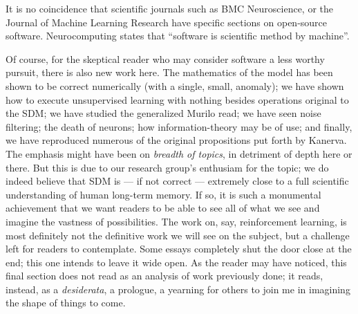 It is no coincidence that scientific journals such as BMC Neuroscience, or the Journal of Machine Learning Research have specific sections on open-source software. Neurocomputing states that “software is scientific method by machine”.

Of course, for the skeptical reader who may consider software a less worthy pursuit, there is also new work here.  The mathematics of the model has been shown to be correct numerically (with a single, small, anomaly); we have shown how to execute unsupervised learning with nothing besides operations original to the SDM; we have studied the generalized Murilo read; we have seen noise filtering; the death of neurons; how information-theory may be of use; and finally, we have reproduced numerous of the original propositions put forth by Kanerva.  The emphasis might have been on \emph{breadth of topics}, in detriment of depth here or there.  But this is due to our research group's enthusiam for the topic; we do indeed believe that SDM is --- if not correct --- extremely close to a full scientific understanding of human long-term memory.  If so, it is such a monumental achievement that we want readers to be able to see all of what we see and imagine the vastness of possibilities.  The work on, say, reinforcement learning, is most definitely not the definitive work we will see on the subject, but a challenge left for readers to contemplate. Some essays completely shut the door close at the end; this one intends to leave it wide open. As the reader may have noticed, this final section does not read as an analysis of work previously done; it reads, instead, as a \emph{desiderata}, a prologue, a yearning for others to join me in imagining the shape of things to come.


